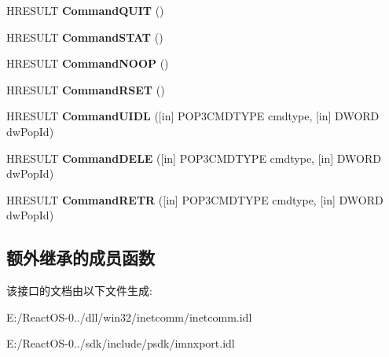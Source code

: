 \begin{DoxyCompactItemize}
\item 
\mbox{\label{class_i_p_o_p3_transport_a3eef61fced37df22574bd5e240284098}} 
H\+R\+E\+S\+U\+LT {\bfseries Command\+Q\+U\+IT} ()
\item 
\mbox{\label{class_i_p_o_p3_transport_a89bb4ea984c7a4edef8390b7b5ae86b9}} 
H\+R\+E\+S\+U\+LT {\bfseries Command\+S\+T\+AT} ()
\item 
\mbox{\label{class_i_p_o_p3_transport_af2e156583f3dafb1df6981f70aa5dc90}} 
H\+R\+E\+S\+U\+LT {\bfseries Command\+N\+O\+OP} ()
\item 
\mbox{\label{class_i_p_o_p3_transport_a98ac19f6b805a3bc23a14d9f88e21028}} 
H\+R\+E\+S\+U\+LT {\bfseries Command\+R\+S\+ET} ()
\item 
\mbox{\label{class_i_p_o_p3_transport_a1d3147a8544ddeeadde478986ce4f6cd}} 
H\+R\+E\+S\+U\+LT {\bfseries Command\+U\+I\+DL} (\mbox{[}in\mbox{]} P\+O\+P3\+C\+M\+D\+T\+Y\+PE cmdtype, \mbox{[}in\mbox{]} D\+W\+O\+RD dw\+Pop\+Id)
\item 
\mbox{\label{class_i_p_o_p3_transport_ac5de1c293f7c07f5932366a903a41b48}} 
H\+R\+E\+S\+U\+LT {\bfseries Command\+D\+E\+LE} (\mbox{[}in\mbox{]} P\+O\+P3\+C\+M\+D\+T\+Y\+PE cmdtype, \mbox{[}in\mbox{]} D\+W\+O\+RD dw\+Pop\+Id)
\item 
\mbox{\label{class_i_p_o_p3_transport_ad090a011203377846248e1a1fa128378}} 
H\+R\+E\+S\+U\+LT {\bfseries Command\+R\+E\+TR} (\mbox{[}in\mbox{]} P\+O\+P3\+C\+M\+D\+T\+Y\+PE cmdtype, \mbox{[}in\mbox{]} D\+W\+O\+RD dw\+Pop\+Id)
\end{DoxyCompactItemize}
\subsection*{额外继承的成员函数}


该接口的文档由以下文件生成\+:\begin{DoxyCompactItemize}
\item 
E\+:/\+React\+O\+S-\/0../dll/win32/inetcomm/inetcomm.\+idl\item 
E\+:/\+React\+O\+S-\/0../sdk/include/psdk/imnxport.\+idl\end{DoxyCompactItemize}

